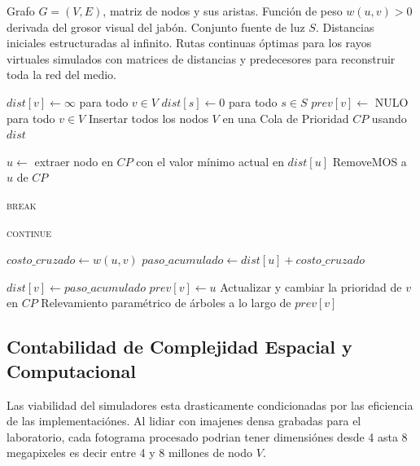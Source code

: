 \begin{algorithm}[H]
\caption{Cálculo computacional de trayectorias en flujo ramificado}
\begin{algorithmic}[1]
\Require Grafo $G = (V, E)$, matriz de nodos y sus aristas. Función de peso $w(u,v) > 0$ derivada del grosor visual del jabón. Conjunto fuente de luz $S$. Distancias iniciales estructuradas al infinito.
\Ensure Rutas continuas óptimas para los rayos virtuales simulados con matrices de distancias y predecesores para reconstruir toda la red del medio.

\State $dist[v] \gets \infty$ para todo $v \in V$
\State $dist[s] \gets 0$ para todo $s \in S$
\State $prev[v] \gets$ NULO para todo $v \in V$ 
\State Insertar todos los nodos $V$ en una Cola de Prioridad $CP$ usando $dist$

    \State $u \gets$ extraer nodo en $CP$ con el valor mínimo actual en $dist[u]$
    \State RemoveMOS a $u$ de $CP$
    
        \State \textsc{break} 
    \EndIf

            \State \textsc{continue} 
        \EndIf
        
        \State $costo\_cruzado \gets w(u, v)$ 
        \State $paso\_acumulado \gets dist[u] + costo\_cruzado$
        
            \State $dist[v] \gets paso\_acumulado$
            \State $prev[v] \gets u$ 
            \State Actualizar y cambiar la prioridad de $v$ en $CP$
        \EndIf
    \EndFor
\EndWhile
\State \Return Relevamiento paramétrico de árboles a lo largo de $prev[v]$ 
\end{algorithmic}
\label{alg:SimulacionFlujo}
\end{algorithm}

\subsection{Contabilidad de Complejidad Espacial y Computacional}

Las viabilidad del simuladores esta drasticamente condicionadas por las eficiencia de las implementaciónes. Al lidiar con imajenes densa grabadas para el laboratorio, cada fotograma procesado podrian tener dimensiónes desde 4 asta 8 megapixeles es decir entre 4 y 8 millones de nodo $V$.

